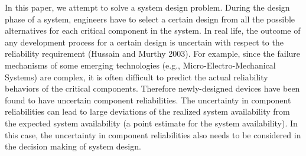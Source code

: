 \documentclass[10pt,a4paper]{article}
\begin{document}
In this paper, we attempt to solve a system design problem. During the design phase of a system, engineers have to select a certain design from all the possible alternatives for each critical component in the system. In real life, the outcome of any development process for a certain design is uncertain with respect to the reliability requirement (Hussain and Murthy 2003). For example, since the failure mechanisms of some emerging technologies (e.g., Micro-Electro-Mechanical Systems) are complex, it is often difficult to predict the actual reliability behaviors of the critical components. Therefore newly-designed devices have been found to have uncertain component reliabilities. The uncertainty in component reliabilities can lead to large deviations of the realized system availability from the expected system availability (a point estimate for the system availability). In this case, the uncertainty in component reliabilities also needs to be considered in the decision making of system design.


%
\end{document}
